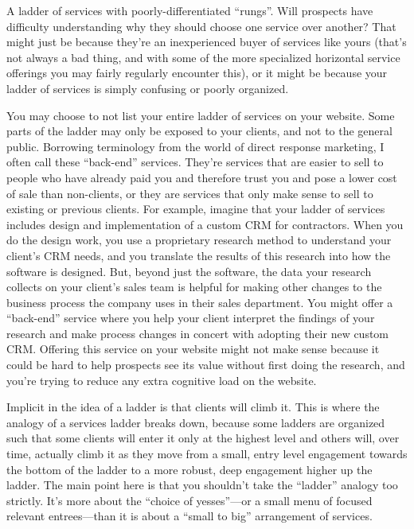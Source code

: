A ladder of services with poorly-differentiated ``rungs''. Will prospects have difficulty understanding why they should choose one service over another? That might just be because they're an inexperienced buyer of services like yours (that's not always a bad thing, and with some of the more specialized horizontal service offerings you may fairly regularly encounter this), or it might be because your ladder of services is simply confusing or poorly organized.

You may choose to not list your entire ladder of services on your website. Some parts of the ladder may only be exposed to your clients, and not to the general public. Borrowing terminology from the world of direct response marketing, I often call these ``back-end'' services. They're services that are easier to sell to people who have already paid you and therefore trust you and pose a lower cost of sale than non-clients, or they are services that only make sense to sell to existing or previous clients. For example, imagine that your ladder of services includes design and implementation of a custom CRM for contractors. When you do the design work, you use a proprietary research method to understand your client's CRM needs, and you translate the results of this research into how the software is designed. But, beyond just the software, the data your research collects on your client's sales team is helpful for making other changes to the business process the company uses in their sales department. You might offer a ``back-end'' service where you help your client interpret the findings of your research and make process changes in concert with adopting their new custom CRM. Offering this service on your website might not make sense because it could be hard to help prospects see its value without first doing the research, and you're trying to reduce any extra cognitive load on the website.

Implicit in the idea of a ladder is that clients will climb it. This is where the analogy of a services ladder breaks down, because some ladders are organized such that some clients will enter it only at the highest level and others will, over time, actually climb it as they move from a small, entry level engagement towards the bottom of the ladder to a more robust, deep engagement higher up the ladder. The main point here is that you shouldn't take the ``ladder'' analogy too strictly. It's more about the ``choice of yesses”—or a small menu of focused relevant entrees—than it is about a ``small to big'' arrangement of services.

